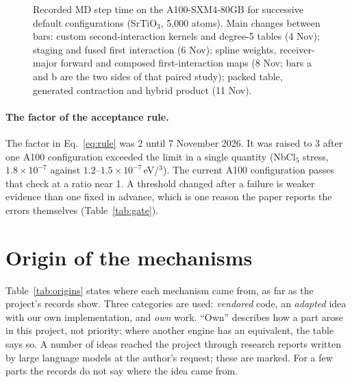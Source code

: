 \documentclass[11pt]{article}
\newcommand{\angstrom}{\text{\AA}}
\begin{document}
\begin{figure}[H]
\centering
{}
\caption{Recorded MD step time on the A100-SXM4-80GB for successive default configurations (SrTiO$_3$, 5{,}000
atoms). Main changes between bars: custom second-interaction kernels and degree-5 tables (4 Nov); staging and
fused first interaction (6 Nov); spline weights, receiver-major forward and composed first-interaction maps
(8 Nov; bars a and b are the two sides of that paired study); packed table, generated contraction and hybrid
product (11 Nov).}
\label{fig:history}
\end{figure}

\paragraph{The factor of the acceptance rule.}
The factor in Eq.~\eqref{eq:rule} was 2 until 7 November 2026. It was raised to 3 after one A100 configuration
exceeded the limit in a single quantity (NbCl$_5$ stress, $1.8\times10^{-7}$ against
$1.2$--$1.5\times10^{-7}$\,eV/\angstrom$^3$). The current A100 configuration passes that check at a ratio near
1. A threshold changed after a failure is weaker evidence than one fixed in advance, which is one reason the
paper reports the errors themselves (Table~\ref{tab:gate}).

\section{Origin of the mechanisms}
\label{app:origins}

Table~\ref{tab:origins} states where each mechanism came from, as far as the project's records show. Three
categories are used: \emph{vendored} code, an \emph{adapted} idea with our own implementation, and \emph{own}
work. ``Own'' describes how a part arose in this project, not priority: where another engine has an equivalent,
the table says so. A number of ideas reached the project through research reports written by large language
models at the author's request; these are marked. For a few parts the records do not say where the idea came
from.
\end{document}
